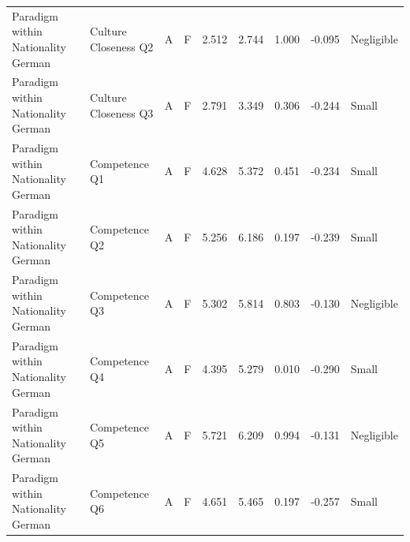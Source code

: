 \begin{table}
\begin{tabular}{llllrrrrl}
Paradigm  within  Nationality  German & Culture  Closeness  Q2 & A & F & 2.512 & 2.744 & 1.000 & -0.095 & Negligible \\
Paradigm  within  Nationality  German & Culture  Closeness  Q3 & A & F & 2.791 & 3.349 & 0.306 & -0.244 & Small \\
Paradigm  within  Nationality  German & Competence  Q1 & A & F & 4.628 & 5.372 & 0.451 & -0.234 & Small \\
Paradigm  within  Nationality  German & Competence  Q2 & A & F & 5.256 & 6.186 & 0.197 & -0.239 & Small \\
Paradigm  within  Nationality  German & Competence  Q3 & A & F & 5.302 & 5.814 & 0.803 & -0.130 & Negligible \\
Paradigm  within  Nationality  German & Competence  Q4 & A & F & 4.395 & 5.279 & 0.010 & -0.290 & Small \\
Paradigm  within  Nationality  German & Competence  Q5 & A & F & 5.721 & 6.209 & 0.994 & -0.131 & Negligible \\
Paradigm  within  Nationality  German & Competence  Q6 & A & F & 4.651 & 5.465 & 0.197 & -0.257 & Small \\
\bottomrule
\end{tabular}
\end{table}
